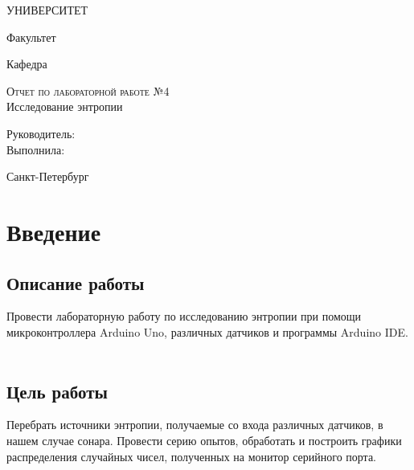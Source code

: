 \documentclass[12pt,a4paper]{scrartcl}
\begin{document}
\begin{titlepage}
  \begin{center}
    \large
 
    УНИВЕРСИТЕТ 
    \vspace{0.25cm}
     
    Факультет
     
    Кафедра 
    \vfill
 
    \textsc{Отчет по лабораторной работе №4}\\[5mm]
     
    {\LARGE Исследование энтропии}

\end{center}
\vfill
 
\newlength{\ML}
\hfill\begin{minipage}{0.4\textwidth}
  Руководитель: \\
  Выполнила: \\
 
  
  
\end{minipage}%
\bigskip

 
\begin{center}
  Санкт-Петербург
\end{center}
\end{titlepage}

\begin{tableofcontents}
\end{tableofcontents}
    \newpage
    
\section{Введение}

\label{sec:intro}
 
\subsection{Описание работы}
Провести лабораторную работу по исследованию энтропии при помощи микроконтроллера Arduino Uno, различных датчиков и программы Arduino IDE.\\
\\

\subsection{Цель работы}
Перебрать источники энтропии, получаемые со входа различных датчиков, в нашем случае сонара. Провести серию опытов, обработать и построить графики распределения случайных чисел, полученных на монитор серийного порта. 
\end{document}

